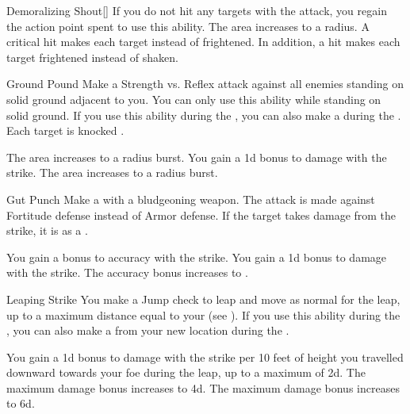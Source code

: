 {\begin{ability}{Demoralizing Shout}[]
                \rankline
                 If you do not hit any targets with the attack, you regain the action point spent to use this ability.
                 The area increases to a \areahuge radius.
                 A critical hit makes each target \panicked instead of frightened.
                In addition, a hit makes each target frightened instead of shaken.
            \end{ability}

            \begin{ability}{Ground Pound}
                Make a Strength vs. Reflex attack against all enemies standing on solid ground adjacent to you.
                You can only use this ability while standing on solid ground.
                If you use this ability during the , you can also make a  during the .
                \hit Each target is knocked \prone.

                \rankline
                 The area increases to a \areamed radius burst.
                 You gain a \plus1d bonus to damage with the strike.
                 The area increases to a \arealarge radius burst.
            \end{ability}

            \begin{ability}{Gut Punch}
                Make a  with a bludgeoning weapon.
                The attack is made against Fortitude defense instead of Armor defense.
                If the target takes damage from the strike, it is \sickened as a .

                \rankline
                 You gain a  bonus to accuracy with the strike.
                 You gain a \plus1d bonus to damage with the strike.
                 The accuracy bonus increases to .
            \end{ability}

            \begin{ability}{Leaping Strike}
                You make a Jump check to leap and move as normal for the leap, up to a maximum distance equal to your  (see ).
                If you use this ability during the , you can also make a  from your new location during the .

                \rankline
                 You gain a \plus1d bonus to damage with the strike per 10 feet of height you travelled downward towards your foe during the leap, up to a maximum of \plus2d.
                 The maximum damage bonus increases to \plus4d.
                 The maximum damage bonus increases to \plus6d.
            \end{ability}

}
